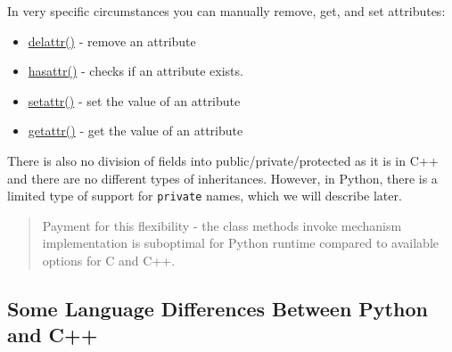 \documentclass[
]{article}
\begin{document}
In very specific circumstances you can manually remove, get, and set
attributes:

\begin{itemize}
\item
  \href{https://docs.python.org/3/library/functions.html?highlight=getattr\#delattr}{delattr()}
  - remove an attribute
\item
  \href{https://docs.python.org/3/library/functions.html?highlight=getattr\#hasattr}{hasattr()}
  - checks if an attribute exists.
\item
  \href{https://docs.python.org/3/library/functions.html?highlight=getattr\#setattr}{setattr()}
  - set the value of an attribute
\item
  \href{https://docs.python.org/3/library/functions.html?highlight=getattr\#getattr}{getattr()}
  - get the value of an attribute
\end{itemize}

There is also no division of fields into public/private/protected as it
is in C++ and there are no different types of inheritances. However, in
Python, there is a limited type of support for \texttt{private} names,
which we will describe later.

\begin{quote}
Payment for this flexibility - the class methods invoke mechanism
implementation is suboptimal for Python runtime compared to available
options for C and C++.
\end{quote}

\hypertarget{some-language-differences-between-python-and-c}{%
\subsection{Some Language Differences Between Python and
C++}\label{some-language-differences-between-python-and-c}}
\end{document}
